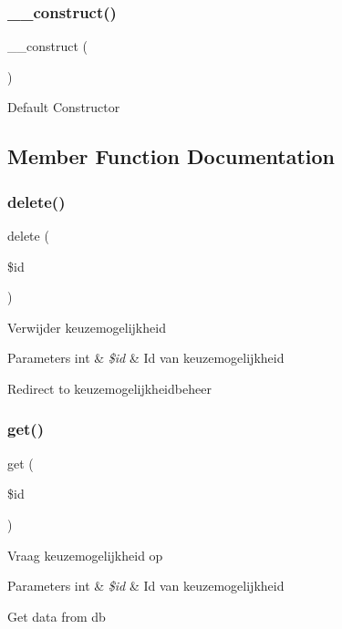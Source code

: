 \subsubsection{\texorpdfstring{\+\_\+\+\_\+construct()}{\_\_construct()}}
{\footnotesize\ttfamily \+\_\+\+\_\+construct (\begin{DoxyParamCaption}{ }\end{DoxyParamCaption})}

Default Constructor

\subsection{Member Function Documentation}
\mbox{\label{class_keuzemogelijkheid_a2f8258add505482d7f00ea26493a5723}} 
\subsubsection{\texorpdfstring{delete()}{delete()}}
{\footnotesize\ttfamily delete (\begin{DoxyParamCaption}\item[{}]{\$id }\end{DoxyParamCaption})}

Verwijder keuzemogelijkheid 
\begin{DoxyParams}[1]{Parameters}
int & {\em \$id} & Id van keuzemogelijkheid \\
\hline
\end{DoxyParams}
Redirect to keuzemogelijkheidbeheer \mbox{\label{class_keuzemogelijkheid_a50e3bfb586b2f42932a6a93f3fbb0828}} 
\subsubsection{\texorpdfstring{get()}{get()}}
{\footnotesize\ttfamily get (\begin{DoxyParamCaption}\item[{}]{\$id }\end{DoxyParamCaption})}

Vraag keuzemogelijkheid op 
\begin{DoxyParams}[1]{Parameters}
int & {\em \$id} & Id van keuzemogelijkheid \\
\hline
\end{DoxyParams}
Get data from db

